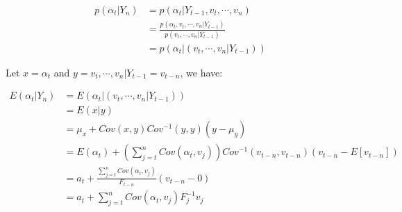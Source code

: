 \documentclass{article}
\begin{document}
\begin{align*}
    p(\alpha_{t}|Y_{n}) &=  p(\alpha_{t}|Y_{t-1}, v_t, \cdots, v_n)\\
    &= \frac{p(\alpha_{t}, v_t, \cdots, v_n|Y_{t-1})}{p(v_t, \cdots, v_n|Y_{t-1})}\\
    &= p(\alpha_{t}| (v_t, \cdots, v_n | Y_{t-1}))
\end{align*}

\par\noindent
Let \(x = \alpha_{t}\) and \(y = v_t, \cdots, v_n | Y_{t-1} = v_{t-n} \), we have:

\begin{align*}
    E(\alpha_{t}|Y_{n}) &= E(\alpha_{t} | (v_t, \cdots, v_n | Y_{t-1}))\\
    &= E(x|y)\\
    &= \mu_x + Cov(x,y)Cov^{-1}(y,y)(y-\mu_{y})\\
    &= E(\alpha_{t}) + (\sum_{j=t}^{n}Cov(\alpha_{t}, v_{j})
    )Cov^{-1}(v_{t-n},v_{t-n})(v_{t-n}-E[v_{t-n}])\\
    &= a_t + \frac{\sum_{j=t}^{n}Cov(\alpha_{t}, v_{j})}{F_{t-n}}(v_{t-n}-0)\\
    &= a_t + \sum_{j=t}^{n}Cov(\alpha_{t}, v_{j})F_{j}^{-1}v_{j}
\end{align*}
\end{document}
